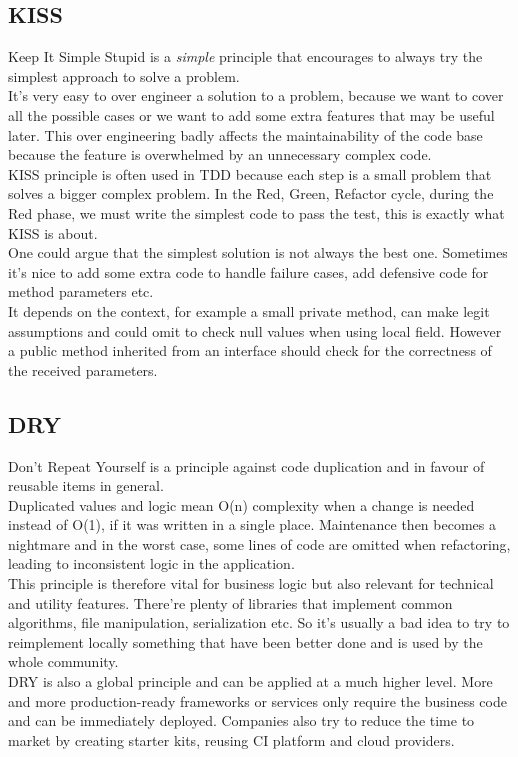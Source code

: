 \subsection{KISS}\label{subsec:kiss}
Keep It Simple Stupid is a \textit{simple} principle that encourages to
always try the simplest approach to solve a problem. \\
\newline
It's very easy to over engineer a solution to a problem, because we want
to cover all the possible cases or we want to add some extra
features that may be useful later.
This over engineering badly affects the maintainability of the code base
because the feature is overwhelmed by an unnecessary complex code. \\
\newline
KISS principle is often used in TDD because each step is a small
problem that solves a bigger complex problem.
In the Red, Green, Refactor cycle, during the Red phase, we must write
the simplest code to pass the test, this is exactly what KISS is about.
\\
\newline
One could argue that the simplest solution is not always the best one.
Sometimes it's nice to add some extra code to handle failure cases, add
defensive code for method parameters etc. \\
It depends on the context, for example a small private method, can make
legit assumptions and could omit to check null values when using
local field.
However a public method inherited from an interface should check for the
correctness of the received parameters.

\subsection{DRY}\label{subsec:dry}
Don't Repeat Yourself is a principle against code duplication and in
favour of reusable items in general. \\
\newline
Duplicated values and logic mean O(n) complexity when a change is needed
instead of O(1), if it was written in a single place.
Maintenance then becomes a nightmare and in the worst case, some lines of
code are omitted when refactoring, leading to inconsistent logic in the
application. \\
\newline
This principle is therefore vital for business logic but also relevant
for technical and utility features.
There're plenty of libraries that implement common algorithms, file
manipulation, serialization etc.
So it's usually a bad idea to try to reimplement locally something that
have been better done and is used by the whole community. \\
\newline
DRY is also a global principle and can be applied at a much higher level.
More and more production-ready frameworks or services only require
the business code and can be immediately deployed.
Companies also try to reduce the time to market by creating starter kits,
reusing CI platform and cloud providers.

